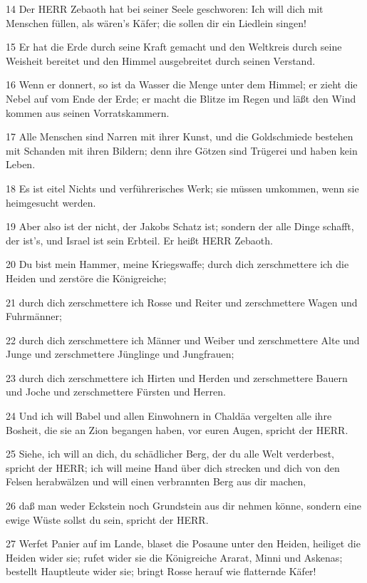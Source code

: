 \par 14 Der HERR Zebaoth hat bei seiner Seele geschworen: Ich will dich mit Menschen füllen, als wären's Käfer; die sollen dir ein Liedlein singen!
\par 15 Er hat die Erde durch seine Kraft gemacht und den Weltkreis durch seine Weisheit bereitet und den Himmel ausgebreitet durch seinen Verstand.
\par 16 Wenn er donnert, so ist da Wasser die Menge unter dem Himmel; er zieht die Nebel auf vom Ende der Erde; er macht die Blitze im Regen und läßt den Wind kommen aus seinen Vorratskammern.
\par 17 Alle Menschen sind Narren mit ihrer Kunst, und die Goldschmiede bestehen mit Schanden mit ihren Bildern; denn ihre Götzen sind Trügerei und haben kein Leben.
\par 18 Es ist eitel Nichts und verführerisches Werk; sie müssen umkommen, wenn sie heimgesucht werden.
\par 19 Aber also ist der nicht, der Jakobs Schatz ist; sondern der alle Dinge schafft, der ist's, und Israel ist sein Erbteil. Er heißt HERR Zebaoth.
\par 20 Du bist mein Hammer, meine Kriegswaffe; durch dich zerschmettere ich die Heiden und zerstöre die Königreiche;
\par 21 durch dich zerschmettere ich Rosse und Reiter und zerschmettere Wagen und Fuhrmänner;
\par 22 durch dich zerschmettere ich Männer und Weiber und zerschmettere Alte und Junge und zerschmettere Jünglinge und Jungfrauen;
\par 23 durch dich zerschmettere ich Hirten und Herden und zerschmettere Bauern und Joche und zerschmettere Fürsten und Herren.
\par 24 Und ich will Babel und allen Einwohnern in Chaldäa vergelten alle ihre Bosheit, die sie an Zion begangen haben, vor euren Augen, spricht der HERR.
\par 25 Siehe, ich will an dich, du schädlicher Berg, der du alle Welt verderbest, spricht der HERR; ich will meine Hand über dich strecken und dich von den Felsen herabwälzen und will einen verbrannten Berg aus dir machen,
\par 26 daß man weder Eckstein noch Grundstein aus dir nehmen könne, sondern eine ewige Wüste sollst du sein, spricht der HERR.
\par 27 Werfet Panier auf im Lande, blaset die Posaune unter den Heiden, heiliget die Heiden wider sie; rufet wider sie die Königreiche Ararat, Minni und Askenas; bestellt Hauptleute wider sie; bringt Rosse herauf wie flatternde Käfer!

